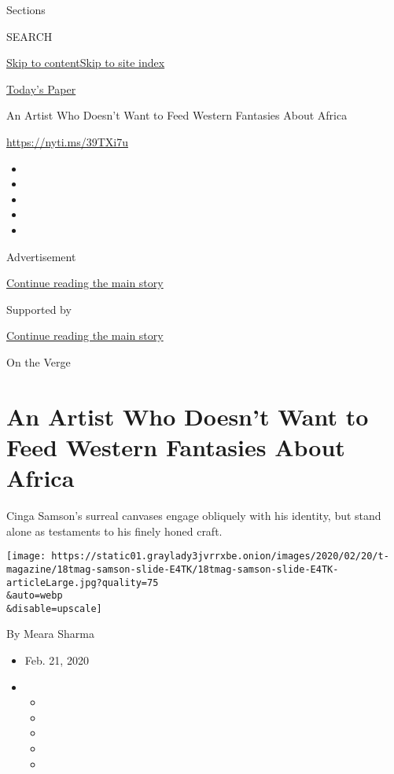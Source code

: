 Sections

SEARCH

\protect\hyperlink{site-content}{Skip to
content}\protect\hyperlink{site-index}{Skip to site index}

\href{https://myaccount.nytimes3xbfgragh.onion/auth/login?response_type=cookie\&client_id=vi}{}

\href{https://www.nytimes3xbfgragh.onion/section/todayspaper}{Today's
Paper}

An Artist Who Doesn't Want to Feed Western Fantasies About Africa

\url{https://nyti.ms/39TXi7u}

\begin{itemize}
\item
\item
\item
\item
\item
\end{itemize}

Advertisement

\protect\hyperlink{after-top}{Continue reading the main story}

Supported by

\protect\hyperlink{after-sponsor}{Continue reading the main story}

On the Verge

\hypertarget{an-artist-who-doesnt-want-to-feed-western-fantasies-about-africa}{%
\section{An Artist Who Doesn't Want to Feed Western Fantasies About
Africa}\label{an-artist-who-doesnt-want-to-feed-western-fantasies-about-africa}}

Cinga Samson's surreal canvases engage obliquely with his identity, but
stand alone as testaments to his finely honed craft.

\texttt{[image: https://static01.graylady3jvrrxbe.onion/images/2020/02/20/t-magazine/18tmag-samson-slide-E4TK/18tmag-samson-slide-E4TK-articleLarge.jpg?quality=75\\\&auto=webp\\\&disable=upscale]}

By Meara Sharma

\begin{itemize}
\item
  Feb. 21, 2020
\item
  \begin{itemize}
  \item
  \item
  \item
  \item
  \item
  \end{itemize}
\end{itemize}

